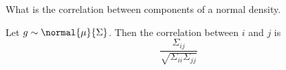 

What is the correlation between
components of a normal density.


\begin{prop}
Let $g \sim \normal{\mu}{\Sigma}$.
Then the correlation between $i$ and $j$
is
\[
  \frac{\Sigma_{ij}}{\sqrt{\Sigma_{ii}\Sigma_{jj}}}
\]
\end{prop}
